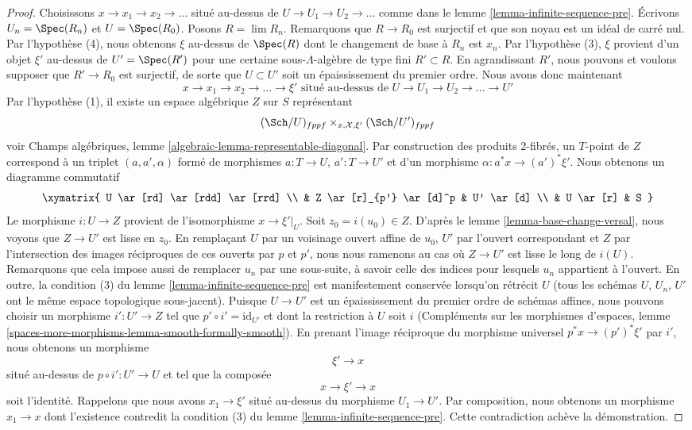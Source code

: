 \begin{proof}
\medskip\noindent
Choisissons $x \to x_1 \to x_2 \to \ldots$ situé au-dessus de
$U \to U_1 \to U_2 \to \ldots$ comme dans le lemme
\ref{lemma-infinite-sequence-pre}. Écrivons $U_n = \Spec(R_n)$ et
$U = \Spec(R_0)$. Posons $R = \lim R_n$. Remarquons que $R \to R_0$ est
surjectif et que son noyau est un idéal de carré nul. Par l'hypothèse (4),
nous obtenons $\xi$ au-dessus de $\Spec(R)$ dont le changement de base à
$R_n$ est $x_n$. Par l'hypothèse (3), $\xi$ provient d'un objet $\xi'$ au-dessus
de $U' = \Spec(R')$ pour une certaine sous-$\Lambda$-algèbre de type fini
$R' \subset R$. En agrandissant $R'$, nous pouvons et voulons supposer que
$R' \to R_0$ est surjectif, de sorte que $U \subset U'$ soit un
épaississement du premier ordre. Nous avons donc maintenant
$$
x \to x_1 \to x_2 \to \ldots \to \xi'
\text{ situé au-dessus de }
U \to U_1 \to U_2 \to \ldots \to U'
$$
Par l'hypothèse (1), il existe un espace algébrique $Z$ sur $S$ représentant
$$
(\Sch/U)_{fppf} \times_{x, \mathcal{X}, \xi'} (\Sch/U')_{fppf}
$$
voir Champs algébriques, lemme
\ref{algebraic-lemma-representable-diagonal}. Par construction des produits
$2$-fibrés, un $T$-point de $Z$ correspond à un triplet
$(a, a', \alpha)$ formé de morphismes $a : T \to U$, $a' : T \to U'$ et
d'un morphisme $\alpha : a^*x \to (a')^*\xi'$. Nous obtenons un diagramme
commutatif
$$
\xymatrix{
U \ar[rd] \ar[rdd] \ar[rrd] \\
& Z \ar[r]_{p'} \ar[d]^p & U' \ar[d] \\
& U \ar[r] & S
}
$$
Le morphisme $i : U \to Z$ provient de l'isomorphisme $x \to \xi'|_U$.
Soit $z_0 = i(u_0) \in Z$. D'après le lemme
\ref{lemma-base-change-versal}, nous voyons que $Z \to U'$ est lisse en
$z_0$. En remplaçant $U$ par un voisinage ouvert affine de $u_0$, $U'$ par
l'ouvert correspondant et $Z$ par l'intersection des images réciproques de
ces ouverts par $p$ et $p'$, nous nous ramenons au cas où $Z \to U'$ est
lisse le long de $i(U)$. Remarquons que cela impose aussi de remplacer $u_n$
par une sous-suite, à savoir celle des indices pour lesquels $u_n$ appartient
à l'ouvert. En outre, la condition (3) du lemme
\ref{lemma-infinite-sequence-pre} est manifestement conservée lorsqu'on
rétrécit $U$ (tous les schémas $U$, $U_n$, $U'$ ont le même espace
topologique sous-jacent). Puisque $U \to U'$ est un épaississement du premier
ordre de schémas affines, nous pouvons choisir un morphisme $i' : U' \to Z$
tel que $p' \circ i' = \text{id}_{U'}$ et dont la restriction à $U$ soit $i$
(Compléments sur les morphismes d'espaces, lemme
\ref{spaces-more-morphisms-lemma-smooth-formally-smooth}).
En prenant l'image réciproque du morphisme universel
$p^*x \to (p')^*\xi'$ par $i'$, nous obtenons un morphisme
$$
\xi' \to x
$$
situé au-dessus de $p \circ i' : U' \to U$ et tel que la composée
$$
x \to \xi' \to x
$$
soit l'identité. Rappelons que nous avons $x_1 \to \xi'$ situé au-dessus du
morphisme $U_1 \to U'$. Par composition, nous obtenons un morphisme
$x_1 \to x$ dont l'existence contredit la condition (3) du lemme
\ref{lemma-infinite-sequence-pre}. Cette contradiction achève la démonstration.
\end{proof}

